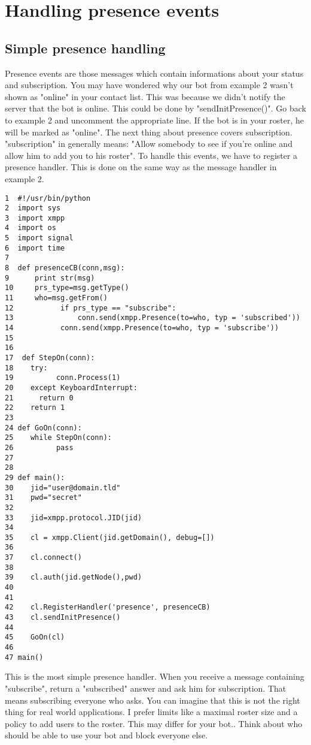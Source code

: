 \section{Handling presence events}

\subsection{Simple presence handling}

Presence events are those messages which contain informations about your status and subscription.
You may have wondered why our bot from example 2 wasn't shown as "online" in your contact list.
This was because we didn't notify the server that the bot is online. This could be done by "sendInitPresence()". Go back to example 2 and uncomment the appropriate line. If the bot is in your roster, he will be marked as "online".
\newline
\newline
The next thing about presence covers subscription. "subscription" in generally means: "Allow somebody to see if you're online and allow him to add you to his roster".
To handle this events, we have to register a presence handler. This is done on the same way as the message handler in example 2.

\begin{verbatim}
1  #!/usr/bin/python
2  import sys
3  import xmpp
4  import os
5  import signal
6  import time
7
8  def presenceCB(conn,msg):
9      print str(msg)
10     prs_type=msg.getType()
11     who=msg.getFrom()
12           if prs_type == "subscribe":
13               conn.send(xmpp.Presence(to=who, typ = 'subscribed'))
14	         conn.send(xmpp.Presence(to=who, typ = 'subscribe'))
15
16
17  def StepOn(conn):
18    try:
19          conn.Process(1)
20    except KeyboardInterrupt:
21	    return 0
22    return 1
23
24 def GoOn(conn):
25    while StepOn(conn):
26          pass
27
28
29 def main():
30    jid="user@domain.tld"
31    pwd="secret"
32
33    jid=xmpp.protocol.JID(jid)
34
35    cl = xmpp.Client(jid.getDomain(), debug=[])
36
37    cl.connect()
38
39    cl.auth(jid.getNode(),pwd)
40
41
42    cl.RegisterHandler('presence', presenceCB)
43    cl.sendInitPresence()
44
45    GoOn(cl)
46
47 main()
\end{verbatim}
This is the most simple presence handler. When you receive a message containing "subscribe", return a "subscribed" answer and ask him for subscription. That means subscribing everyone who asks.
You can imagine that this is not the right thing for real world applications. I prefer limits like a maximal roster size and a policy to add users to the roster. This may differ for your bot..
\newline
Think about who should be able to use your bot and block everyone else.
\newpage
